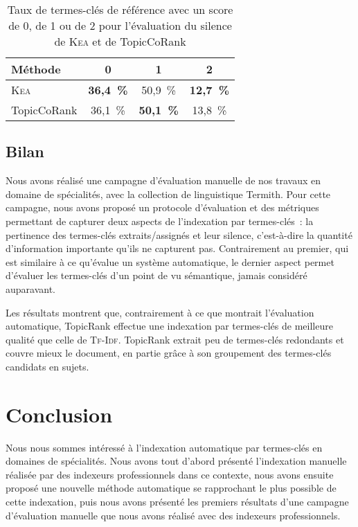         \TODO{\dots}
        \begin{table}[h!]
          \centering
          \begin{tabular}{l|c|c|c}
            \toprule
            \textbf{Méthode} & \textbf{0} & \textbf{1} & \textbf{2}\\
            \hline
            \textsc{Kea} & \textbf{36,4~\%} & 50,9~\% & \textbf{12,7~\%}\\
            TopicCoRank & 36,1~\% & \textbf{50,1~\%} & 13,8~\%\\
            \bottomrule
          \end{tabular}
          \caption{Taux de termes-clés de référence avec un score de 0, de 1 ou
                   de 2 pour l'évaluation du silence de \textsc{Kea} et de
                   TopicCoRank
                   \label{tab:main-domain_specific_keyphrase_annotation-manual_evaluation-analysis-topiccorank-silence_score_ratio}}
        \end{table}

    \subsection{Bilan}
    \label{subsec:main-domain_specific_keyphrase_annotation-manual_evaluation-conclusion}
      Nous avons réalisé une campagne d'évaluation manuelle de nos travaux en
      domaine de spécialités, avec la collection de linguistique Termith. Pour
      cette campagne, nous avons proposé un protocole d'évaluation et des
      métriques permettant de capturer deux aspects de l'indexation par
      termes-clés~: la pertinence des termes-clés extraits/assignés et leur
      silence, c'est-à-dire la quantité d'information importante qu'ils ne
      capturent pas. Contrairement au premier, qui est similaire à ce qu'évalue
      un système automatique, le dernier aspect permet d'évaluer les termes-clés
      d'un point de vu sémantique, jamais considéré auparavant.

      Les résultats montrent que, contrairement à ce que montrait l'évaluation
      automatique, TopicRank effectue une indexation par termes-clés de
      meilleure qualité que celle de \textsc{Tf-Idf}. TopicRank extrait peu de
      termes-clés redondants et couvre mieux le document, en partie grâce à son
      groupement des termes-clés candidats en sujets.


  \section{Conclusion}
  \label{sec:main-domain_specific_keyphrase_annotation-conclusion}
    Nous nous sommes intéressé à l'indexation automatique par termes-clés en
    domaines de spécialités. Nous avons tout d'abord présenté l'indexation
    manuelle réalisée par des indexeurs professionnels dans ce contexte, nous
    avons ensuite proposé une nouvelle méthode automatique se rapprochant le
    plus possible de cette indexation, puis nous avons présenté les premiers
    résultats d'une campagne d'évaluation manuelle que nous avons réalisé avec
    des indexeurs professionnels.

